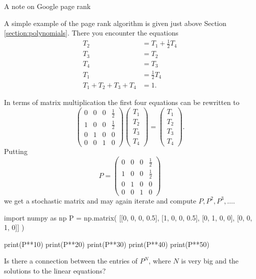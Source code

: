 \documentclass{article}
\begin{document}
\begin{hideinbutton}{A note on Google page rank}

  A simple example of the page rank algorithm is
  given just above Section \ref{section:polynomials}. There you
  encounter the equations
  \begin{align*}
    T_2 &= T_1 + \tfrac{1}{2} T_4\\
    T_3 &= T_2\\
    T_4 &= T_3\\
    T_1 &= \tfrac{1}{2} T_4\\
    T_1 + T_2 + T_3 + T_4 &= 1.
  \end{align*}
  
  In terms of matrix multiplication the first four equations can be rewritten to
  $$
  \begin{pmatrix}
    0 & 0 & 0 & \tfrac{1}{2} \\[5pt]
    1 & 0 & 0 & \tfrac{1}{2}\\[5pt]
    0 & 1 & 0 & 0 \\[5pt]
    0 & 0 & 1 & 0 
  \end{pmatrix}
  \begin{pmatrix}
    T_1 \\[5pt] T_2 \\[5pt] T_3 \\[5pt] T_4
  \end{pmatrix} =
  \begin{pmatrix}
    T_1 \\[5pt] T_2 \\[5pt] T_3 \\[5pt] T_4
  \end{pmatrix}.
  $$
  Putting
  $$
  P = \begin{pmatrix}
    0 & 0 & 0 & \tfrac{1}{2} \\[5pt]
    1 & 0 & 0 & \tfrac{1}{2}\\[5pt]
    0 & 1 & 0 & 0 \\[5pt]
    0 & 0 & 1 & 0 
  \end{pmatrix}
  $$
  we get a stochastic matrix and  may again iterate and compute $P, P^2, P^3, \dots$.

\begin{sage}
import numpy as np
P = np.matrix( [[0, 0, 0, 0.5], [1, 0, 0, 0.5], [0, 1, 0, 0], [0, 0, 1, 0]] )

print(P**10)
print(P**20)
print(P**30)
print(P**40)
print(P**50)
\end{sage}

Is there a connection between the entries of $P^N$, where $N$ is very big and the solutions to the linear equations? 
\end{hideinbutton}
\end{document}
